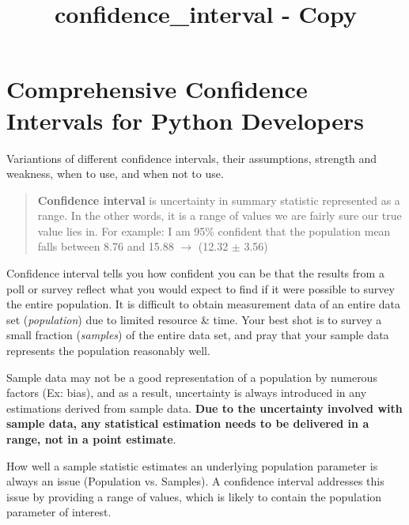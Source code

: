 \documentclass[11pt]{article}
\title{confidence\_interval - Copy}
\begin{document}
    
    
    \maketitle
    
    

    
    \section{Comprehensive Confidence Intervals for Python
Developers}\label{comprehensive-confidence-intervals-for-python-developers}

Variantions of different confidence intervals, their assumptions,
strength and weakness, when to use, and when not to use.

    \begin{quote}
\textbf{Confidence interval} is uncertainty in summary statistic
represented as a range. In the other words, it is a range of values we
are fairly sure our true value lies in. For example: I am 95\% confident
that the population mean falls between 8.76 and 15.88 \(\rightarrow\)
(12.32 \(\pm\) 3.56)
\end{quote}

Confidence interval tells you how confident you can be that the results
from a poll or survey reflect what you would expect to find if it were
possible to survey the entire population. It is difficult to obtain
measurement data of an entire data set (\emph{population}) due to
limited resource \& time. Your best shot is to survey a small fraction
(\emph{samples}) of the entire data set, and pray that your sample data
represents the population reasonably well.

Sample data may not be a good representation of a population by numerous
factors (Ex: bias), and as a result, uncertainty is always introduced in
any estimations derived from sample data. \textbf{Due to the uncertainty
involved with sample data, any statistical estimation needs to be
delivered in a range, not in a point estimate}.

How well a sample statistic estimates an underlying population parameter
is always an issue (Population vs. Samples). A confidence interval
addresses this issue by providing a range of values, which is likely to
contain the population parameter of interest.
\end{document}
